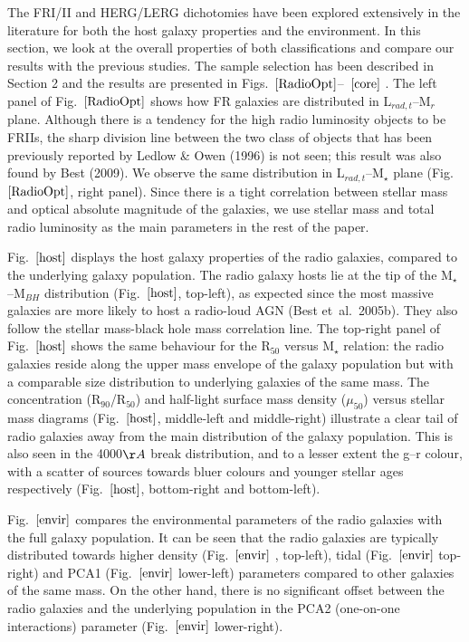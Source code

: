 \documentclass[usenatbib]{mn2e}
\begin{document}
The FRI/II and HERG/LERG dichotomies have been explored extensively in the
literature for both the host galaxy properties and the environment. In
this section, we look at the overall properties of both classifications
and compare our results with the previous studies. The sample selection
has been described in Section 2 and the results are presented in
Figs.~$\ref{RadioOpt}$--~$\ref{core}$ . The left panel of Fig.~$\ref{RadioOpt}$ shows how FR galaxies are distributed
in L$_{rad,t}$--M$_{r}$ plane. Although there is a tendency for the high
radio luminosity objects to be FRIIs, the sharp division line between the
two class of objects that has been previously reported by Ledlow \& Owen
(1996) is not seen; this result was also found by Best (2009). We observe
the same distribution in L$_{rad,t}$--M$_{\star}$ plane (Fig.~$\ref{RadioOpt}$, right
panel). Since there is a tight correlation between stellar mass and
optical absolute magnitude of the galaxies, we use stellar mass and total
radio luminosity as the main parameters in the rest of the paper.




Fig.~$\ref{host}$ displays the host galaxy properties of the radio galaxies, compared
to the underlying galaxy population. The radio galaxy hosts lie at the tip
of the M$_{\star}$--M$_{BH}$ distribution (Fig.~$\ref{host}$, top-left), as expected
since the most massive galaxies are more likely to host a radio-loud AGN
(Best et~al.\ 2005b). They also follow the stellar mass-black hole mass
correlation line. The top-right panel of Fig.~$\ref{host}$ shows the same behaviour
for the R$_{50}$ versus M$_{\star}$ relation: the radio galaxies reside
along the upper mass envelope of the galaxy population but with a
comparable size distribution to underlying galaxies of the same mass. The
concentration (R$_{90}$/R$_{50}$) and half-light surface mass density
($\mu_{50}$) versus stellar mass diagrams (Fig.~$\ref{host}$, middle-left and
middle-right) illustrate a clear tail of radio galaxies away from the main
distribution of the galaxy population. This is also seen in the 4000$\AA$
break distribution, and to a lesser extent the g--r colour, with a scatter
of sources towards bluer colours and younger stellar ages respectively
(Fig.~$\ref{host}$, bottom-right and bottom-left).

Fig.~$\ref{envir}$ compares the environmental parameters of the radio galaxies with
the full galaxy population. It can be seen that the radio galaxies are
typically distributed towards higher density (Fig.~$\ref{envir}$ , top-left), tidal
(Fig.~$\ref{envir}$  top-right) and PCA1 (Fig.~$\ref{envir}$  lower-left) parameters compared to
other galaxies of the same mass. On the other hand, there is no
significant offset between the radio galaxies and the underlying
population in the PCA2 (one-on-one interactions) parameter (Fig.~$\ref{envir}$ 
lower-right). 
\end{document}
